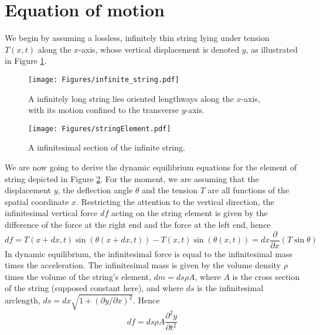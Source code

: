 \section{Equation of motion}





We begin by assuming a lossless, infinitely thin string lying under tension $T(x,t)$ along the $x$-axis, whose vertical displacement is denoted $y$, as illustrated in Figure \ref{fig:infinite_string}. 
\begin{figure}[hbt]
\begin{center}
\texttt{[image: Figures/infinite\_string.pdf]}
\caption{A infinitely long string lies oriented lengthways along the $x$-axis, with its motion confined to the transverse $y$-axis.}
\label{fig:infinite_string}
\end{center}
\end{figure}
\begin{figure}[hbt]
\begin{center}
\texttt{[image: Figures/stringElement.pdf]}
\caption{A infinitesimal section of the infinite string. }
\label{fig:infinitesimal_string}
\end{center}
\end{figure}
We are now going to derive the dynamic equilibrium equations for the element of string depicted in Figure \ref{fig:infinitesimal_string}. For the moment, we are assuming that the displacement $y$, the deflection angle $\theta$ and the tension $T$ are all functions of the spatial coordinate $x$. Restricting the attention to the vertical direction, the infinitesimal vertical force $df$ acting on the string element is given by the difference of the force at the right end and the force at the left end, hence
\begin{equation}\label{eq:balance_eq}
df = T(x+dx,t) \sin\left( \theta(x+dx,t) \right) - T(x,t) \sin\left( \theta(x,t) \right) = dx \frac{\partial}{\partial x}(T \sin\theta)
\end{equation}
In dynamic equilibrium, the infinitesimal force is equal to the infinitesimal mass times the acceleration. The infinitesimal mass is given by the volume density $\rho$ times the volume of the string's element, $dm = ds \rho A$, where $A$ is the cross section of the string (supposed constant here), and where $ds$ is the infinitesimal arclength, $ds = dx \sqrt{1+(\partial y / \partial x)^2}$. Hence
\begin{equation}\label{eq:inf_mass}
df = ds \rho A \frac{\partial^2 y}{\partial t^2}
\end{equation}
